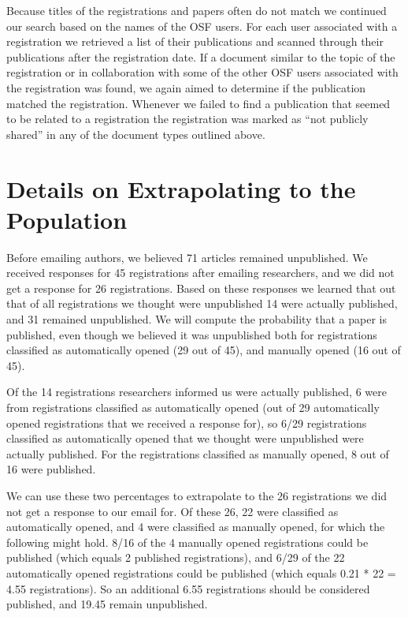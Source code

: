 \documentclass[
  ,jou, a4paper,floatsintext]{apa6}
\begin{document}
Because titles of the registrations and papers often do not match we continued our search based on the names of the OSF users. For each user associated with a registration we retrieved a list of their publications and scanned through their publications after the registration date. If a document similar to the topic of the registration or in collaboration with some of the other OSF users associated with the registration was found, we again aimed to determine if the publication matched the registration. Whenever we failed to find a publication that seemed to be related to a registration the registration was marked as ``not publicly shared'' in any of the document types outlined above.

\hypertarget{details-on-extrapolating-to-the-population}{%
\section{Details on Extrapolating to the Population}\label{details-on-extrapolating-to-the-population}}

Before emailing authors, we believed 71 articles remained unpublished. We received responses for 45 registrations after emailing researchers, and we did not get a response for 26 registrations. Based on these responses we learned that out that of all registrations we thought were unpublished 14 were actually published, and 31 remained unpublished. We will compute the probability that a paper is published, even though we believed it was unpublished both for registrations classified as automatically opened (29 out of 45), and manually opened (16 out of 45).

Of the 14 registrations researchers informed us were actually published, 6 were from registrations classified as automatically opened (out of 29 automatically opened registrations that we received a response for), so 6/29 registrations classified as automatically opened that we thought were unpublished were actually published. For the registrations classified as manually opened, 8 out of 16 were published.

We can use these two percentages to extrapolate to the 26 registrations we did not get a response to our email for. Of these 26, 22 were classified as automatically opened, and 4 were classified as manually opened, for which the following might hold. 8/16 of the 4 manually opened registrations could be published (which equals 2 published registrations), and 6/29 of the 22 automatically opened registrations could be published (which equals 0.21 * 22 = 4.55 registrations). So an additional 6.55 registrations should be considered published, and 19.45 remain unpublished.
\end{document}
